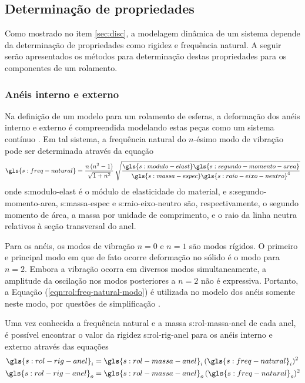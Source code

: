 \documentclass[12pt,oneside,english,brazil,lmodern,siglas,simbolos,cite=num]{ucsmonograph}
\begin{document}
	\subsection{Determinação de propriedades}
	Como mostrado no item \ref{sec:disc}, a modelagem dinâmica de um sistema depende da determinação de propriedades como rigidez e frequência natural.
	A seguir serão apresentados os métodos para determinação destas propriedades para os componentes de um rolamento.
	
	\subsubsection{Anéis interno e externo} \label{sec:props-aneis}
	Na definição de um modelo para um rolamento de esferas, a deformação dos anéis interno e externo é compreendida modelando estas peças como um sistema contínuo \cite{sassi:2007}.
	Em tal sistema, a frequência natural do $n$-ésimo modo de vibração pode ser determinada através da equação \cite{tandon:1997,sassi:2007,cong:2013}
	\begin{equation} \label{eqn:rol:freq-natural-modo}
		\gls{s:freq-natural} = \frac{n\,(n^2-1)}{\sqrt{1+n^2}}\:
		\sqrt{\frac{\gls{s:modulo-elast}\gls{s:segundo-momento-area}}{
		\gls{s:massa-espec}\gls{s:raio-eixo-neutro}^4}}
	\end{equation}
	onde \gls{s:modulo-elast} é o módulo de elasticidade do material, e \gls{s:segundo-momento-area}, \gls{s:massa-espec} e \gls{s:raio-eixo-neutro} são, respectivamente, o segundo momento de área, a massa por unidade de comprimento, e o raio da linha neutra relativos à seção transversal do anel.
	
	Para os anéis, os modos de vibração $n=0$ e $n=1$ são modos rígidos.
	O primeiro e principal modo em que de fato ocorre deformação no sólido é o modo para $n=2$.
	Embora a vibração ocorra em diversos modos simultaneamente, a amplitude da oscilação nos modos posteriores a $n=2$ não é expressiva.
	Portanto, a Equação (\ref{eqn:rol:freq-natural-modo}) é utilizada no modelo dos anéis somente neste modo, por questões de simplificação \cite{sassi:2007}.
	
	Uma vez conhecida a frequência natural e a massa \gls{s:rol-massa-anel} de cada anel, é possível encontrar o valor da rigidez \gls{s:rol-rig-anel} para os anéis interno e externo através das equações \cite{sassi:2007}
	\begin{align}
		\gls{s:rol-rig-anel}_i &= \gls{s:rol-massa-anel}_i\,
			(\gls{s:freq-natural}_i)^2 \label{eqn:rol:rig-anel-int}\\
		\gls{s:rol-rig-anel}_o &= \gls{s:rol-massa-anel}_o\,
			(\gls{s:freq-natural}_o)^2 \label{eqn:rol:rig-anel-ext}
	\end{align}
	
\end{document}
